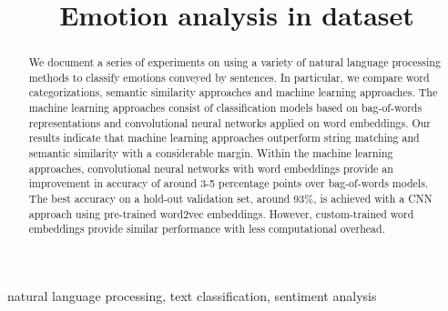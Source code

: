 \documentclass[conference]{IEEEtran}
\begin{document}
\title{Emotion analysis in dataset}


\author{
\and
{}
\and
{}

}

\maketitle

\begin{abstract}
We document a series of experiments on using a variety of natural language processing methods to classify emotions conveyed by sentences. In particular, we compare word categorizations, semantic similarity approaches and machine learning approaches. The machine learning approaches consist of classification models based on bag-of-words representations and convolutional neural networks applied on word embeddings. Our results indicate that machine learning approaches outperform string matching and semantic similarity with a considerable margin. Within the machine learning approaches, convolutional neural networks with word embeddings provide an improvement in accuracy of around 3-5 percentage points over bag-of-words models. The best accuracy on a hold-out validation set, around 93\%, is achieved with a CNN approach using pre-trained word2vec embeddings. However, custom-trained word embeddings provide similar performance with less computational overhead.
\end{abstract}

\begin{IEEEkeywords}
natural language processing, text classification, sentiment analysis
\end{IEEEkeywords}
\end{document}
